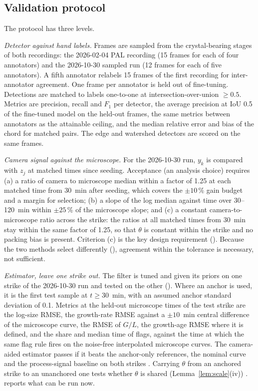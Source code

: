 \subsection{Validation protocol}\label{sec:validation}

The protocol has three levels.

\emph{Detector against hand labels.} Frames are sampled from the crystal-bearing stages of both recordings: the
2026-02-04 PAL recording (15 frames for each of four annotators) and the 2026-10-30 sampled run (12 frames for each of
five annotators). A fifth annotator relabels 15 frames of the first recording for inter-annotator agreement. One frame
per annotator is held out of fine-tuning. Detections are matched to labels one-to-one at intersection-over-union
$\ge 0.5$. Metrics are precision, recall and $F_1$ per detector, the average precision at IoU 0.5 of the fine-tuned
model on the held-out frames, the same metrics between annotators as the attainable ceiling, and the median relative
error and bias of the chord for matched pairs. The edge and watershed detectors are scored on the same frames.

\emph{Camera signal against the microscope.} For the 2026-10-30 run, $y_k$ is compared with $z_j$ at matched times
since seeding. Acceptance (an analysis choice) requires (a) a ratio of camera to microscope median within a
factor of 1.25 at each matched time from 30~min after seeding, which covers the $\pm 10$\,\% gain budget and a margin
for selection; (b) a slope of the log median against time over 30--120~min within $\pm 25$\,\% of the microscope
slope; and (c) a constant camera-to-microscope ratio across the strike: the ratios at all matched times from 30~min
stay within the same factor of 1.25, so that $\theta$ is constant within the strike and no packing bias is present.
Criterion (c) is the key design requirement (). Because the two methods select differently
(), agreement within the tolerance is necessary, not sufficient.

\emph{Estimator, leave one strike out.} The filter is tuned and given its priors on one strike of the 2026-10-30 run
and tested on the other (). Where an anchor is used, it is the first test sample at
$t \ge 30$~min, with an assumed anchor standard deviation of 0.1. Metrics at the held-out microscope times of the test
strike are the log-size RMSE, the growth-rate RMSE against a $\pm 10$~min central difference of the microscope curve,
the RMSE of $G/L$, the growth-age RMSE where it is defined, and the share and median time of flags, against the time
at which the same flag rule fires on the noise-free interpolated microscope curves. The camera-aided estimator passes if it beats the anchor-only references, the nominal curve
and the process-signal baseline on both strikes . Carrying $\theta$ from an anchored strike to
an unanchored one tests whether $\theta$ is shared (Lemma~\ref{lem:scale}(iv)) .
 reports what can be run now.
